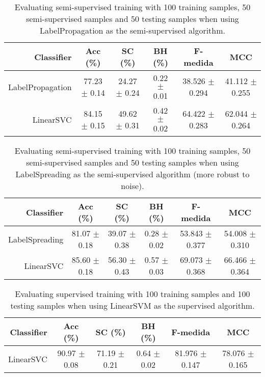 \begin{table}[!htb]
\footnotesize
\centering
\caption{Evaluating semi-supervised training with 100 training samples, 50 semi-supervised samples and 50 testing samples when using LabelPropagation as the semi-supervised algorithm.}
\label{tab:label-propagation}
\begin{tabular}{r|c|c|c|c|c} \hline\hline
Classifier & Acc (\%) & SC (\%) & BH (\%) & F-medida & MCC \\ \hline
LabelPropagation & 77.23 $\pm$ 0.14 & 24.27 $\pm$ 0.24 & 0.22 $\pm$ 0.01 & 38.526 $\pm$ 0.294 & 41.112 $\pm$ 0.255 \\
LinearSVC & 84.15 $\pm$ 0.15 & 49.62 $\pm$ 0.31 & 0.42 $\pm$ 0.02 & 64.422 $\pm$ 0.283 & 62.044 $\pm$ 0.264 \\
\hline\hline
\end{tabular}
\end{table}
\begin{table}[!htb]
\footnotesize
\centering
\caption{Evaluating semi-supervised training with 100 training samples, 50 semi-supervised samples and 50 testing samples when using LabelSpreading as the semi-supervised algorithm (more robust to noise).}
\label{tab:label-spreading}
\begin{tabular}{r|c|c|c|c|c} \hline\hline
Classifier & Acc (\%) & SC (\%) & BH (\%) & F-medida & MCC \\ \hline
LabelSpreading & 81.07 $\pm$ 0.18 & 39.07 $\pm$ 0.38 & 0.28 $\pm$ 0.02 & 53.843 $\pm$ 0.377 & 54.008 $\pm$ 0.310 \\
LinearSVC & 85.60 $\pm$ 0.18 & 56.30 $\pm$ 0.43 & 0.57 $\pm$ 0.03 & 69.073 $\pm$ 0.368 & 66.466 $\pm$ 0.364 \\
\hline\hline
\end{tabular}
\end{table}
\begin{table}[!htb]
\footnotesize
\centering
\caption{Evaluating supervised training with 100 training samples and 100 testing samples when using LinearSVM as the supervised algorithm.}
\label{tab:linear-svm}
\begin{tabular}{r|c|c|c|c|c} \hline\hline
Classifier & Acc (\%) & SC (\%) & BH (\%) & F-medida & MCC \\ \hline
LinearSVC & 90.97 $\pm$ 0.08 & 71.19 $\pm$ 0.21 & 0.64 $\pm$ 0.02 & 81.976 $\pm$ 0.147 & 78.076 $\pm$ 0.165 \\
\hline\hline
\end{tabular}
\end{table}
